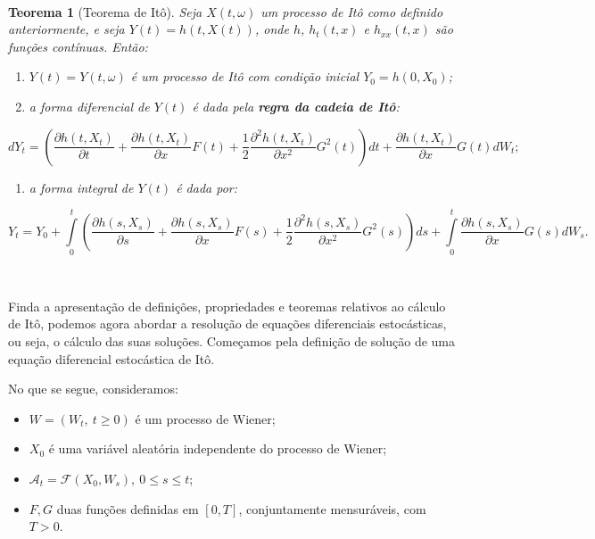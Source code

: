 \documentclass[
  11pt,
  a4paper,
]{book}
\providecommand{\tightlist}{%
  \setlength{\itemsep}{0pt}\setlength{\parskip}{0pt}}
\newtheorem{theorem}{Teorema}[chapter]
\theoremstyle{definition}
\theoremstyle{definition}
\theoremstyle{definition}
\theoremstyle{definition}
\theoremstyle{remark}
\begin{document}
\(\,\)

\begin{theorem}[Teorema de Itô]
Seja \(X(t,\omega)\) um processo de Itô como definido anteriormente, e seja \(Y(t) = h(t,X(t))\), onde \(h\), \(h_{t}(t,x)\) e \(h_{xx}(t,x)\) são funções contínuas. Então:

\begin{enumerate}
\def\labelenumi{(\roman{enumi})}
\item
  \(Y(t) = Y(t,\omega)\) é um processo de Itô com condição inicial \(Y_0 = h(0, X_0)\);
\item
  a forma diferencial de \(Y(t)\) é dada pela \textbf{regra da cadeia de Itô}:
\end{enumerate}

\[
dY_t = \left(\frac{\partial h(t,X_t)}{\partial t} + \frac{\partial h(t,X_t)}{\partial x} F(t) + \frac{1}{2} \frac{\partial^2 h(t,X_t)}{\partial x^2} G^2(t)\right) dt + \frac{\partial h(t,X_t)}{\partial x} G(t) dW_t;
\]

\begin{enumerate}
\def\labelenumi{(\roman{enumi})}
\setcounter{enumi}{2}
\tightlist
\item
  a forma integral de \(Y(t)\) é dada por:
\end{enumerate}

\[
Y_t = Y_0 + \int\limits_{0}^{t} \left( \frac{\partial h(s,X_s)}{\partial s} + \frac{\partial h(s,X_s)}{\partial x} F(s) + \frac{1}{2} \frac{\partial^2 h(s,X_s)}{\partial x^2} G^2(s) \right) ds + \int\limits_{0}^{t} \frac{\partial h(s,X_s)}{\partial x} G(s) dW_s.
\]
\end{theorem}

\(\,\)

Finda a apresentação de definições, propriedades e teoremas relativos ao cálculo de Itô, podemos agora abordar a resolução de equações diferenciais estocásticas, ou seja, o cálculo das suas soluções. Começamos pela definição de solução de uma equação diferencial estocástica de Itô.

No que se segue, consideramos:

\begin{itemize}
\item
  \(W = (W_t, ~ t \geq 0)\) é um processo de Wiener;
\item
  \(X_0\) é uma variável aleatória independente do processo de Wiener;
\item
  \(\mathcal{A}_t = \mathcal{F}(X_0, W_s), \ 0 \leq s \leq t\);
\item
  \(F, G\) duas funções definidas em \([0,T]\), conjuntamente mensuráveis, com \(T > 0\).
\end{itemize}
\end{document}
